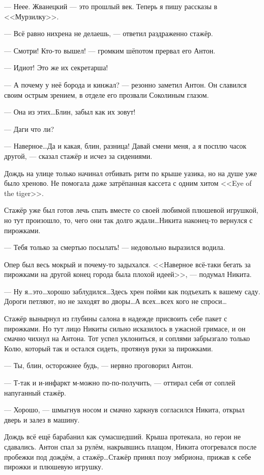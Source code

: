 --- Неее. Жванецкий --- это прошлый век. Теперь я пишу рассказы в <<Мурзилку>>.

--- Всё равно нихрена не делаешь, --- ответил раздраженно стажёр.

--- Смотри! Кто-то вышел! --- громким шёпотом прервал его Антон.

--- Идиот! Это же их секретарша!

--- А почему у неё борода и кинжал? --- резонно заметил Антон. Он славился своим острым зрением, в отделе его прозвали Соколиным глазом.

--- Она из этих\ldots Блин, забыл как их зовут!

--- Даги что ли?

--- Наверное\ldots Да и какая, блин, разница! Давай смени меня, а я посплю часок другой, --- сказал стажёр и исчез за сидениями.

Дождь на улице только начинал отбивать ритм по крыше уазика, но на душе уже было хреново. Не помогала даже затрёпанная кассета с одним хитом <<Eye of the tiger>>.

Стажёр уже был готов лечь спать вместе со своей любимой плюшевой игрушкой, но тут произошло, то, чего они так долго ждали\ldots Никита наконец-то вернулся с пирожками.

--- Тебя только за смертью посылать! --- недовольно выразился водила.

Опер был весь мокрый и почему-то задыхался. <<Наверное всё-таки бегать за пирожками на другой конец города была плохой идеей>>, --- подумал Никита.

--- Ну я\ldots это\ldots хорошо заблудился\ldots Здесь хрен пойми как подъехать к вашему саду. Дороги петляют, но не заходят во дворы\ldots А всех\ldots всех кого не спроси\ldots

Стажёр вынырнул из глубины салона в надежде присвоить себе пакет с пирожками. Но тут лицо Никиты сильно исказилось в ужасной гримасе, и он смачно чихнул на Антона. Тот успел уклониться, и соплями забрызгало только Колю, который так и остался сидеть, протянув руки за пирожками.

--- Ты, блин, осторожнее будь, --- нервно проговорил Антон. 

--- Т-так и и-инфаркт м-можно по-по-получить, --- оттирал себя от соплей напуганный стажёр. 

--- Хорошо, --- шмыгнув носом и смачно харкнув согласился Никита, открыл дверь и залез в машину.

Дождь всё ещё барабанил как сумасшедший. Крыша протекала, но герои не сдавались. Антон спал за рулём, накрывшись плащом, Никита отогревался после пробежки под дождём, а стажёр\ldots Стажёр принял позу эмбриона, прижав к себе пирожки и плюшевую игрушку.

